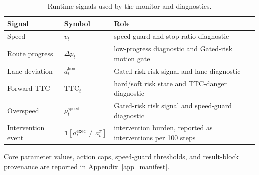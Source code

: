 
\begin{table}[!htbp]
\centering
\caption{Runtime signals used by the monitor and diagnostics.}
\label{tab_runtime_signals}
\scriptsize
\setlength{\tabcolsep}{3.4pt}
\renewcommand{\arraystretch}{1.08}
\begin{tabular}{@{}>{\raggedright\arraybackslash}p{}>{\raggedright\arraybackslash}p{}>{\raggedright\arraybackslash}p{}@{}}
\toprule
Signal & Symbol & Role \\
\midrule
Speed & $v_t$ & speed guard and stop-ratio diagnostic \\
Route progress & $\Delta p_t$ & low-progress diagnostic and Gated-risk motion gate \\
Lane deviation & $d_t^{\mathrm{lane}}$ & Gated-risk risk signal and lane diagnostic \\
Forward TTC & $\mathrm{TTC}_t$ & hard/soft risk state and TTC-danger diagnostic \\
Overspeed & $\rho_t^{\mathrm{speed}}$ & Gated-risk risk signal and speed-guard diagnostic \\
Intervention event & $\mathbf{1}[a_t^{\mathrm{exec}}\ne a_t^\pi]$ & intervention burden, reported as interventions per 100 steps \\
\bottomrule
\end{tabular}
\begin{tablenotes}
\item Core parameter values, action caps, speed-guard thresholds, and result-block provenance are reported in Appendix~\ref{app_manifest}.
\end{tablenotes}
\end{table}

